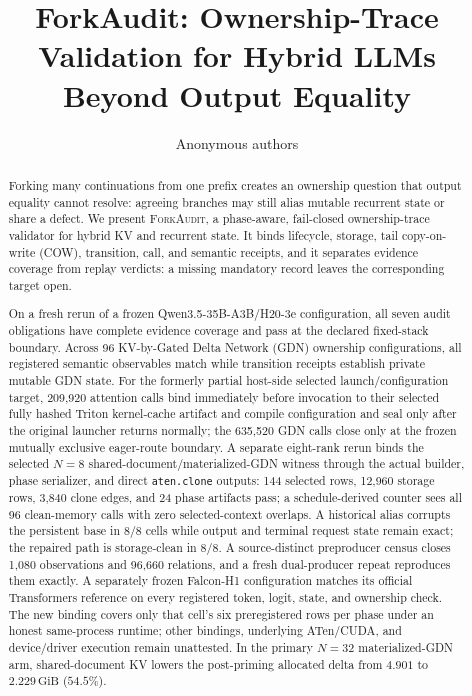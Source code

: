 \documentclass{article}
\title{ForkAudit: Ownership-Trace Validation for Hybrid LLMs Beyond Output Equality}
\author{Anonymous authors}
\newcommand{\method}{\textsc{ForkAudit}}
\newcommand{\gib}{\,\mathrm{GiB}}
\begin{document}
\raggedbottom
\maketitle

\begin{abstract}
Forking many continuations from one prefix creates an ownership question that
output equality cannot resolve: agreeing branches may still alias mutable
recurrent state or share a defect.  We present \method{}, a phase-aware,
fail-closed ownership-trace validator for hybrid KV and recurrent state.  It
binds lifecycle, storage, tail copy-on-write (COW), transition, call, and
semantic receipts,
and it separates evidence coverage from replay verdicts: a missing mandatory
record leaves the corresponding target open.

On a fresh rerun of a frozen Qwen3.5-35B-A3B/H20-3e configuration, all seven
audit obligations have complete evidence coverage and pass at the declared
fixed-stack boundary.  Across 96 KV-by-Gated Delta Network (GDN) ownership
configurations, all registered semantic observables match while transition
receipts establish private mutable GDN state.  For the formerly partial
host-side selected launch/configuration target, 209,920 attention calls bind immediately before invocation to
their selected fully hashed Triton kernel-cache artifact and compile
configuration and seal only after the original launcher returns normally; the
635,520 GDN calls close only at the frozen mutually exclusive eager-route
boundary.  A separate eight-rank rerun binds the selected $N=8$
shared-document/materialized-GDN witness through the actual builder, phase
serializer, and direct \texttt{aten.clone} outputs: 144 selected rows, 12,960
storage rows, 3,840 clone edges, and 24 phase artifacts pass; a schedule-derived counter
sees all 96 clean-memory calls with zero selected-context overlaps.  A
historical alias corrupts the persistent base in 8/8 cells while
output and terminal request state remain exact; the repaired path is
storage-clean in 8/8.  A source-distinct preproducer census closes 1,080
observations and 96,660 relations, and a fresh dual-producer repeat reproduces
them exactly.  A separately frozen Falcon-H1 configuration matches its official
Transformers reference on every registered token, logit, state, and ownership
check.  The new binding covers only that cell's six preregistered rows per
phase under an honest same-process runtime; other bindings, underlying
ATen/CUDA, and device/driver execution remain unattested.  In the primary
$N=32$ materialized-GDN arm, shared-document KV lowers the post-priming
allocated delta from $4.901$ to $2.229\gib$ ($54.5\%$).
\end{abstract}
\end{document}
